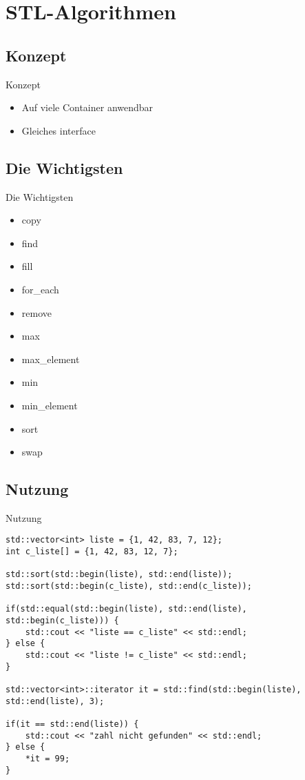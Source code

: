 \section{STL-Algorithmen}


\subsection{Konzept}

\begin{frame}{Konzept}
	\begin{itemize}
		\item Auf viele Container anwendbar
		\item Gleiches interface
	\end{itemize}
\end{frame}

\subsection{Die Wichtigsten}

\begin{frame}{Die Wichtigsten}
	\begin{itemize}
		\item copy
		\item find
		\item fill
		\item for\_each
		\item remove
		\item max
		\item max\_element
		\item min
		\item min\_element
		\item sort
		\item swap
	\end{itemize}
\end{frame}

\subsection{Nutzung}

\begin{frame}[fragile]{Nutzung}
	
	\begin{lstlisting}[basicstyle=\tiny]
std::vector<int> liste = {1, 42, 83, 7, 12};
int c_liste[] = {1, 42, 83, 12, 7};

std::sort(std::begin(liste), std::end(liste));
std::sort(std::begin(c_liste), std::end(c_liste));

if(std::equal(std::begin(liste), std::end(liste), std::begin(c_liste))) {
    std::cout << "liste == c_liste" << std::endl;
} else {
    std::cout << "liste != c_liste" << std::endl;
}

std::vector<int>::iterator it = std::find(std::begin(liste), std::end(liste), 3);

if(it == std::end(liste)) {
    std::cout << "zahl nicht gefunden" << std::endl;
} else {
    *it = 99;
}
	\end{lstlisting}
	
\end{frame}
